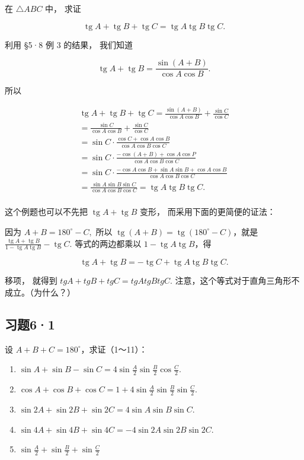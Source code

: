 在 \(\triangle ABC\) 中， 求证

\[
\operatorname{tg} A + \operatorname{tg} B + \operatorname{tg} C = \operatorname{tg} A \operatorname{tg} B \operatorname{tg} C.
\]

 利用 §5·8 例 3 的结果， 我们知道

\[
\operatorname{tg} A + \operatorname{tg} B = \frac {\sin (A + B)}{\cos A \cos B}.
\]

所以

\[
\begin{array}{l} \operatorname{tg} A + \operatorname{tg} B + \operatorname{tg} C = \frac {\sin (A + B)}{\cos A \cos B} + \frac {\sin C}{\cos C} \\ = \frac {\sin C}{\cos A \cos B} + \frac {\sin C}{\cos C} \\ = \sin C \cdot \frac {\cos C + \cos A \cos B}{\cos A \cos B \cos C} \\ = \sin C \cdot \frac {- \cos (A + B) + \cos A \cos P}{\cos A \cos B \cos C} \\ = \sin C \cdot \frac {- \cos A \cos B + \sin A \sin B + \cos A \cos B}{\cos A \cos B \cos C} \\ = \frac {\sin A \sin B \sin C}{\cos A \cos B \cos C} = \operatorname{tg} A \operatorname{tg} B \operatorname{tg} C. \\ \end{array}
\]

这个例题也可以不先把 \(\operatorname{tg} A + \operatorname{tg} B\)
变形， 而采用下面的更简便的证法：

因为 \(A + B = 180^{\circ} - C,\) 所以
\(\operatorname{tg}(A + B) = \operatorname{tg}(180^{\circ} - C)\)，就是
\(\frac{\operatorname{tg} A + \operatorname{tg} B}{1 - \operatorname{tg} A \operatorname{tg} B} - \operatorname{tg} C.\)
等式的两边都乘以 \(1 - \operatorname{tg} A \operatorname{tg} B\)，得

\[
\operatorname{tg} A + \operatorname{tg} B = - \operatorname{tg} C + \operatorname{tg} A \operatorname{tg} B \operatorname{tg} C.
\]

移项， 就得到 \(tg A + tg B + tg C = tg A tg B tg C.\)
注意，这个等式对于直角三角形不成立。（为什么？）

\subsection{习题6·1}

设 \(A + B + C = 180^{\circ}\)，求证（1～11）：

\begin{enumerate}
\item
  \(\sin A + \sin B - \sin C = 4\sin \frac{A}{2}\sin \frac{B}{2}\cos \frac{C}{2}\).
\item
  \(\cos A + \cos B + \cos C = 1 + 4\sin \frac{A}{2}\sin \frac{B}{2}\sin \frac{C}{2}\).
\item
  \(\sin 2A + \sin 2B + \sin 2C = 4\sin A\sin B\sin C.\)
\item
  \(\sin 4A + \sin 4B + \sin 4C = -4\sin 2A\sin 2B\sin 2C.\)
\item
  \(\sin \frac{A}{2} + \sin \frac{B}{2} + \sin \frac{C}{2}\)
\end{enumerate}

